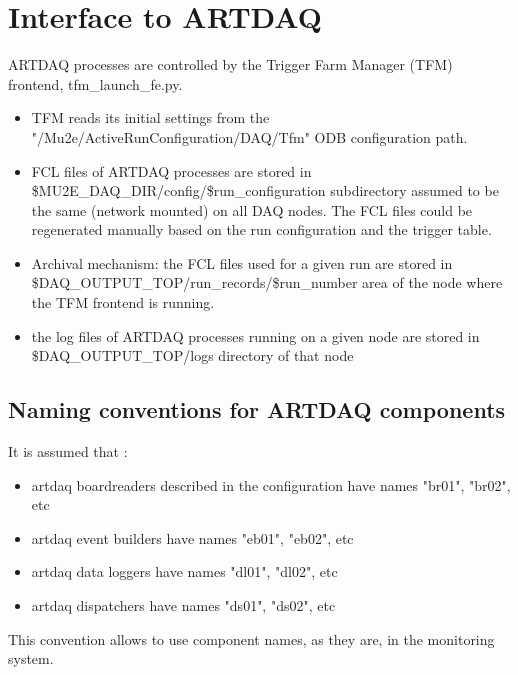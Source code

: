 \section{Interface to ARTDAQ}

ARTDAQ processes are controlled by the Trigger Farm Manager (TFM) frontend,
tfm\_launch\_fe.py.

\begin{itemize}
\item 
  TFM reads its initial settings from the "/Mu2e/ActiveRunConfiguration/DAQ/Tfm"
  ODB configuration path.
\item
  FCL files of ARTDAQ processes are stored in \$MU2E\_DAQ\_DIR/config/\$run\_configuration
  subdirectory assumed to be the same (network mounted) on all DAQ nodes.
  The FCL files could be regenerated manually based on the run configuration and the trigger table.
\item
  Archival mechanism: the FCL files used for a given run are stored
  in \$DAQ\_OUTPUT\_TOP/run\_records/\$run\_number area of the node where the TFM frontend is running.
\item
  the log files of ARTDAQ processes running on a given node are stored in \$DAQ\_OUTPUT\_TOP/logs
  directory of that node
\end{itemize}

\subsection{Naming conventions for ARTDAQ components}

It is assumed that :
\begin{itemize}
\item 
  artdaq boardreaders described in the configuration have names "br01", "br02", etc
\item 
  artdaq event builders have names "eb01", "eb02", etc
\item 
  artdaq data loggers have names "dl01", "dl02", etc
\item 
  artdaq dispatchers have names "ds01", "ds02", etc
\end{itemize}

This convention allows to use component names, as they are, in the monitoring system.


